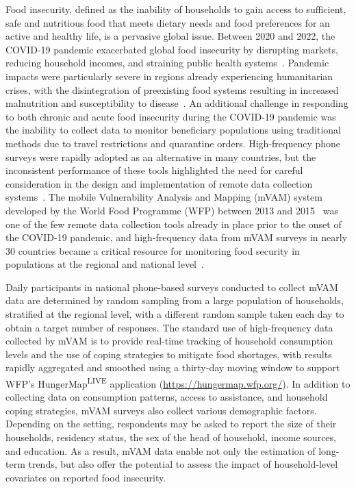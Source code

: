 
Food insecurity, defined as the inability of households to gain access to sufficient, safe and nutritious food that meets dietary needs and food preferences for an active and healthy life, is a pervasive global issue. Between 2020 and 2022, the COVID-19 pandemic exacerbated global food insecurity by disrupting markets, reducing household incomes, and straining public health systems~\cite{Mueller, Pereira}. Pandemic impacts were particularly severe in regions already experiencing humanitarian crises, with the disintegration of preexisting food systems resulting in increased malnutrition and susceptibility to disease~\cite{Pritchard}. An additional challenge in responding to both chronic and acute food insecurity during the COVID-19 pandemic was the inability to collect data to monitor beneficiary populations using traditional methods due to travel restrictions and quarantine orders. High-frequency phone surveys were rapidly adopted as an alternative in many countries, but the inconsistent performance of these tools highlighted the need for careful consideration in the design and implementation of remote data collection systems~\cite{Gourlay,Ratrikaningtyas}. The mobile Vulnerability Analysis and Mapping (mVAM) system developed by the World Food Programme (WFP) between 2013 and 2015~\cite{Mock_PE, Morrow_PE} was one of the few remote data collection tools already in place prior to the onset of the COVID-19 pandemic, and high-frequency data from mVAM surveys in nearly 30 countries became a critical resource for monitoring food security in populations at the regional and national level~\cite{WFP_mVAM}.

Daily participants in national phone-based surveys conducted to collect mVAM data are determined by random sampling from a large population of households, stratified at the regional level, with a different random sample taken each day to obtain a target number of responses. The standard use of high-frequency data collected by mVAM is to provide real-time tracking of household consumption levels and the use of coping strategies to mitigate food shortages, with results rapidly aggregated and smoothed using a thirty-day moving window to support WFP's HungerMap\textsuperscript{LIVE} application (\url{https://hungermap.wfp.org/}). In addition to collecting data on consumption patterns, access to assistance, and household coping strategies, mVAM surveys also collect various demographic factors. Depending on the setting, respondents may be asked to report the size of their households, residency status, the sex of the head of household, income sources, and education. As a result, mVAM data enable not only the estimation of long-term trends, but also offer the potential to assess the impact of household-level covariates on reported food insecurity. 

